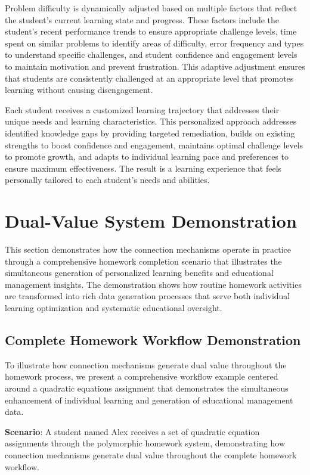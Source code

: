 \documentclass[conference]{IEEEtran}
\begin{document}
\begin{IEEEkeywords}
Problem difficulty is dynamically adjusted based on multiple factors that reflect the student's current learning state and progress. These factors include the student's recent performance trends to ensure appropriate challenge levels, time spent on similar problems to identify areas of difficulty, error frequency and types to understand specific challenges, and student confidence and engagement levels to maintain motivation and prevent frustration. This adaptive adjustment ensures that students are consistently challenged at an appropriate level that promotes learning without causing disengagement.

Each student receives a customized learning trajectory that addresses their unique needs and learning characteristics. This personalized approach addresses identified knowledge gaps by providing targeted remediation, builds on existing strengths to boost confidence and engagement, maintains optimal challenge levels to promote growth, and adapts to individual learning pace and preferences to ensure maximum effectiveness. The result is a learning experience that feels personally tailored to each student's needs and abilities.

\section{Dual-Value System Demonstration}

This section demonstrates how the connection mechanisms operate in practice through a comprehensive homework completion scenario that illustrates the simultaneous generation of personalized learning benefits and educational management insights. The demonstration shows how routine homework activities are transformed into rich data generation processes that serve both individual learning optimization and systematic educational oversight.

\subsection{Complete Homework Workflow Demonstration}

To illustrate how connection mechanisms generate dual value throughout the homework process, we present a comprehensive workflow example centered around a quadratic equations assignment that demonstrates the simultaneous enhancement of individual learning and generation of educational management data.

\textbf{Scenario}: A student named Alex receives a set of quadratic equation assignments through the polymorphic homework system, demonstrating how connection mechanisms generate dual value throughout the complete homework workflow.


\end{IEEEkeywords}
\end{document}
